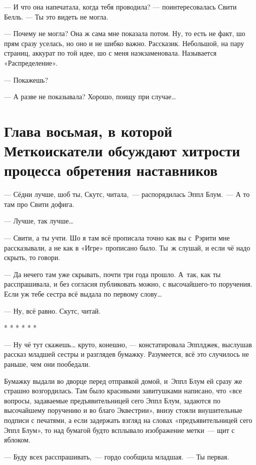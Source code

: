 \documentclass[fontsize=11pt,a5paper,titlepage=firstcover]{scrbook}
\begin{document}
--- И что она напечатала, когда тебя проводила? --- поинтересовалась Свити Белль. --- Ты это видеть не могла.

--- Почему не могла? Она ж сама мне показала потом. Ну, то есть не факт, шо прям сразу уселась, но оно и не шибко важно. Рассказик. Небольшой, на пару страниц, аккурат по той идее, шо с меня наэкзаменовала. Называется «Распределение».

--- Покажешь?

--- А разве не показывала? Хорошо, поищу при случае{\ldots}


\chapter*{Глава восьмая, в которой Меткоискатели обсуждают хитрости процесса обретения наставников}


--- Сёдни лучше, шоб ты, Скутс, читала,~--- распорядилась Эппл Блум.~--- А то там про Свити дофига.

--- Лучше, так лучше{\ldots}

--- Свити, а ты учти. Шо я там всё прописала точно как вы с~Рэрити мне рассказывали, а не как в «Игре» прописано было. Ты~ж слушай, и если чё надо скрыть, то говори.

--- Да нечего там уже скрывать, почти три года прошло. А~так, как ты расспрашивала, и без согласия публиковать можно, с высочайшего-то поручения. Если уж тебе сестра всё выдала по первому слову{\ldots}

--- Ну, всё равно. Скутс, читай.
\begin{center}* * * * * *\end{center}


--- Ну чё тут скажешь{\ldots} круто, конешно, --- констатировала Эпплджек, выслушав рассказ младшей сестры и разглядев бумажку. Разумеется, всё это случилось не раньше, чем они пообедали.

Бумажку выдали во дворце перед отправкой домой, и~Эппл Блум ей сразу же страшно возгордилась. Там было красивыми завитушками написано, что «все вопросы, задаваемые предъявительницей сего Эппл Блум, задаются по высочайшему поручению и во благо Эквестрии», внизу стояли внушительные подписи с печатями, а если задержать взгляд на словах «предъявительницей сего Эппл Блум», то над бумагой будто всплывало изображение метки~--- щит с яблоком.

--- Буду всех расспрашивать,~--- гордо сообщила младшая.~--- Ты первая.
\end{document}
